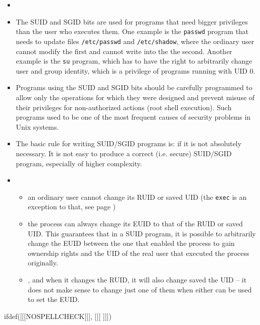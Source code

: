 \begin{itemize}
\item {}
\item \label{SUID_BIT} The SUID and SGID bits are used for programs that need
bigger privileges than the user who executes them. One example is the
\texttt{passwd} program that needs to update files \texttt{/etc/passwd} and
\texttt{/etc/shadow}, where the ordinary user cannot modify the first and
cannot write into the the second. Another example is the \texttt{su} program,
which has to have the right to arbitrarily change user and group identity,
which is a privilege of programs running with UID 0.
\item Programs using the SUID and SGID bits should be carefully programmed
to allow only the operations for which they were designed and prevent misuse
of their privileges for non-authorized actions (root shell execution).
Such programs used to be one of the most frequent causes of security problems
in Unix systems.
\item The basic rule for writing SUID/SGID programs is:  if it is not absolutely necessary.  It is not easy to produce a correct
(i.e. secure) SUID/SGID program, especially of higher complexity.
\item {}
\begin{itemize}
\item an ordinary user cannot change its RUID or saved UID (the \texttt{exec} is
an exception to that, see page \pageref{EXEC})
\item the process can always change its EUID to that of the RUID or saved UID.
This guarantees that in a SUID program, it is possible to arbitrarily change the EUID
between the one that enabled the process to gain ownership rights and the
UID of the real user that executed the process originally.
\item {}, and when it changes the RUID, it will also
change saved the UID -- it does not make sense to change just one of them when
either can be used to set the EUID.
\end{itemize}
\end{itemize}

 
ifdef([[[NOSPELLCHECK]]], [[[
]]])

